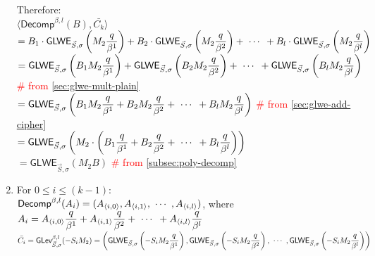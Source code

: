 \begin{myproof}
\begin{enumerate}
Therefore: \\
$\langle \textsf{Decomp}^{\beta, l}(B), \bar{C_k} \rangle$\\
$= B_1 \cdot \textsf{GLWE}_{\vec{S}, \sigma} \left (M_{2}\dfrac{q}{\beta^1} \right ) + B_2 \cdot \textsf{GLWE}_{\vec{S}, \sigma} \left (M_{2}\dfrac{q}{\beta^2} \right ) + \text{ } \text{$\cdots$} \text{ } + B_l \cdot \textsf{GLWE}_{\vec{S}, \sigma} \left (M_{2}\dfrac{q}{\beta^l}\right)$ \\
$= \textsf{GLWE}_{\vec{S}, \sigma} \left (B_1M_{2}\dfrac{q}{\beta^1} \right ) + \textsf{GLWE}_{\vec{S}, \sigma} \left (B_2M_{2}\dfrac{q}{\beta^2} \right ) + \text{ } \text{$\cdots$} \text{ } + \textsf{GLWE}_{\vec{S}, \sigma} \left (B_lM_{2}\dfrac{q}{\beta^l}\right)$ \textcolor{red}{\# from \autoref{sec:glwe-mult-plain}} \\
$= \textsf{GLWE}_{\vec{S}, \sigma} \left (B_1M_{2}\dfrac{q}{\beta^1} + B_2M_{2}\dfrac{q}{\beta^2} + \text{ } \text{$\cdots$} \text{ } + B_lM_{2}\dfrac{q}{\beta^l}\right)$ \textcolor{red}{\# from \autoref{sec:glwe-add-cipher}}\\
$= \textsf{GLWE}_{\vec{S}, \sigma} \left (M_{2} \cdot \left ( B_1\dfrac{q}{\beta^1} + B_2\dfrac{q}{\beta^2} + \text{ } \text{$\cdots$} \text{ } + B_l\dfrac{q}{\beta^l} \right)\right)$ \\
$= \textsf{GLWE}_{\vec{S}, \sigma} (M_{2}B)$ \textcolor{red}{\# from \autoref{subsec:poly-decomp}}
\item For $0 \leq i \leq (k - 1)$: \\
$\textsf{Decomp}^{\beta, l}(A_i) = (A_{\langle i, 0 \rangle}, A_{\langle i, 1 \rangle}, \text{ } \text{$\cdots$} \text{ }, A_{\langle i, l \rangle})$, where $A_i = A_{\langle i, 0 \rangle}\dfrac{q}{\beta^1} + A_{\langle i, 1 \rangle}\dfrac{q}{\beta^2} + \text{ } \text{$\cdots$} \text{ } + A_{\langle i, l \rangle}\dfrac{q}{\beta^l}$ \\
$\bar{C_i} =  \textsf{GLev}_{\vec{S}, \sigma}^{\beta, l}(-S_iM_2) = \left(\textsf{GLWE}_{\vec{S}, \sigma}\left(-S_iM_2\dfrac{q}{\beta^1}\right), \textsf{GLWE}_{\vec{S}, \sigma}\left(-S_iM_2\dfrac{q}{\beta^2}\right), \text{ } \text{$\cdots$} \text{ }, \textsf{GLWE}_{\vec{S}, \sigma}\left(-S_iM_2\dfrac{q}{\beta^l}\right) \right)$ \\


\end{enumerate}
\end{myproof}
